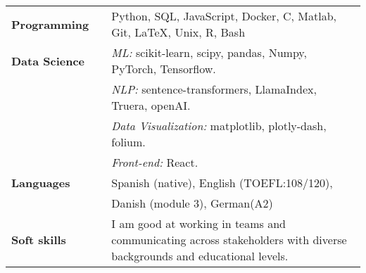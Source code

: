 \documentclass[a4paper, 12pt]{article}
\begin{document}
\begin{tabular}{p{7em} p{1em} p{32.5em}}
\textbf{Programming} & &  Python, SQL, JavaScript, Docker, C, Matlab, Git, \LaTeX, Unix, R,  Bash \\
\textbf{Data Science} & & \textit{ML:} scikit-learn, scipy, pandas, Numpy, PyTorch, Tensorflow. \\
& & \textit{NLP:} sentence-transformers, LlamaIndex, Truera, openAI. \\
& & \textit{Data Visualization:} matplotlib, plotly-dash, folium. \\
& & \textit{Front-end:} React. \\
\textbf{Languages} & & Spanish (native), English (TOEFL:108/120), \\
& & Danish (module 3), German(A2) \\
\textbf{Soft skills} & & I am good at working in teams and communicating across stakeholders with diverse backgrounds and educational levels.  \\
\end{tabular}
\end{document}
